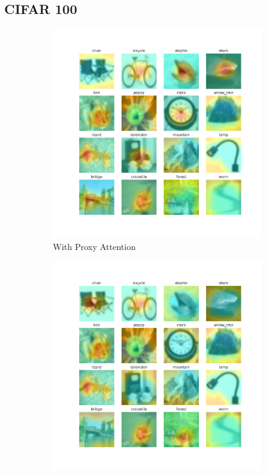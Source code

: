 \subsection{CIFAR 100}
\begin{figure}[h]
    \centering
    \begin{subfigure}[b]{0.7\textwidth}
        \includegraphics[width=\textwidth]{images/proxy.pdf}
        \caption{With Proxy Attention}
        \label{fig:proxy}
    \end{subfigure}
    \hfill
    \begin{subfigure}[b]{.7\textwidth}
        \includegraphics[width=\textwidth]{images/noproxy.pdf}

\end{subfigure}
\end{figure}
